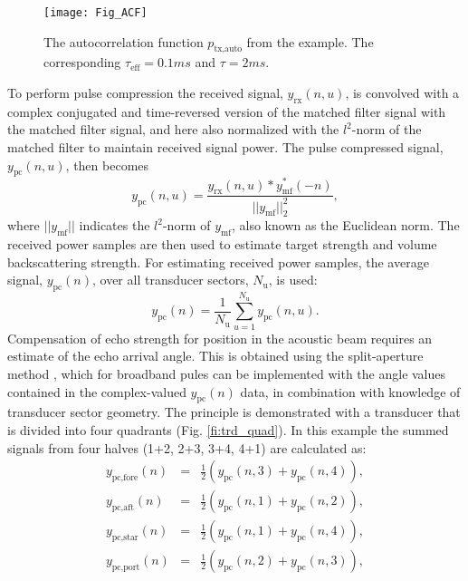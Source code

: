 \documentclass[preprint,12pt,TurnOnLineNumbers]{JASAnew}
\newcommand{\samplesymt}{n}
\newcommand{\channelsym}{u}
\newcommand{\nchannels}{N_{\textrm{u}}}
\newcommand{\tnom}{\tau}
\newcommand{\teff}{\tau_{\textrm{eff}}}
\newcommand{\yrx}{y_{\textrm{rx}}}
\newcommand{\ymf}{y_{\textrm{mf}}}
\newcommand{\ypc}{y_{\textrm{pc}}}
\newcommand{\ptxauto}{p_{\textrm{tx,auto}}}
\begin{document}
\begin{figure}
\texttt{[image: Fig\_ACF]}
\caption{The autocorrelation function $\ptxauto$ from the example. The corresponding $\teff=0.1 ms$ and $\tnom=2 ms$\label{fi:ACF}.}
\end{figure}

To perform pulse compression the received signal, $\yrx(\samplesymt,\channelsym)$, is convolved with a complex conjugated and time-reversed version of the matched filter signal with the matched filter signal, and here also normalized with the $l^2$-norm of the matched filter to maintain received signal power. The pulse compressed signal, $\ypc(\samplesymt,\channelsym)$, then becomes
\begin{equation}
\label{eq:PulseComp}
\ypc(\samplesymt,\channelsym) = \frac{\yrx(\samplesymt,\channelsym)*\ymf^*(-\samplesymt)}{||\ymf||^2_2},
\end{equation}
%
where $||\ymf||$ indicates the $l^2$-norm of $\ymf$, also known as the Euclidean norm. The received power samples are then used to estimate target strength and volume backscattering strength. For estimating received power samples, the average signal, $\ypc(\samplesymt)$, over all transducer sectors, $\nchannels$, is used:
%
\begin{equation}
\label{eq:SumSig}
\ypc(\samplesymt) = \frac{1}{\nchannels} \sum_{\channelsym = 1}^{\nchannels} \ypc(\samplesymt,\channelsym).
\end{equation}
%
Compensation of echo strength for position in the acoustic beam requires an estimate of the echo arrival angle. This is obtained using the split-aperture method \citep{burdic1991}, which for broadband pules can be implemented with the angle values contained in the complex-valued $\ypc(\samplesymt)$ data, in combination with knowledge of transducer sector geometry. The principle is demonstrated with a transducer that is divided into four quadrants (Fig. \ref{fi:trd_quad}). In this example the summed signals from four halves (1+2, 2+3, 3+4, 4+1) are calculated as:
\begin{eqnarray}
\label{eq:SumHalves}
y_{\textrm{pc,fore}}(\samplesymt) & = & \frac{1}{2} \left( \ypc(\samplesymt,3)+\ypc(\samplesymt,4) \right),\\
y_{\textrm{pc,aft}}(\samplesymt) & = & \frac{1}{2} \left( \ypc(\samplesymt,1)+\ypc(\samplesymt,2) \right),\\
y_{\textrm{pc,star}}(\samplesymt) & = & \frac{1}{2} \left( \ypc(\samplesymt,1)+\ypc(\samplesymt,4) \right),\\
y_{\textrm{pc,port}}(\samplesymt) & = & \frac{1}{2} \left( \ypc(\samplesymt,2)+\ypc(\samplesymt,3) \right),
\end{eqnarray}
\end{document}
